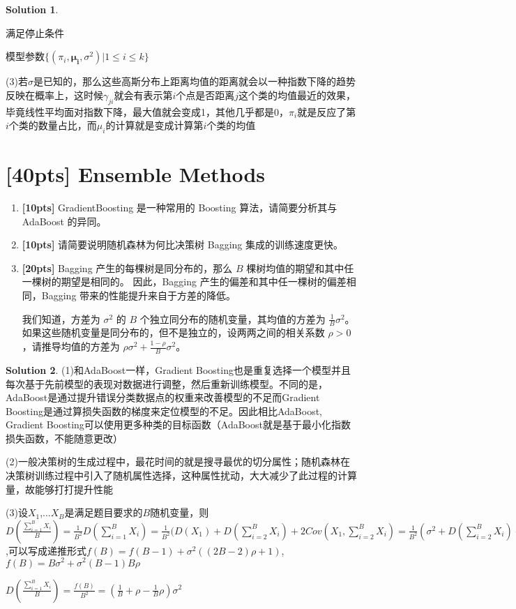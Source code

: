 \documentclass[a4paper,UTF8]{article}
\theoremstyle{definition}
\newtheorem*{solution}{Solution}
\begin{document}
\begin{solution}
\begin{algorithm}[H]
\begin{algorithmic}[1]
	\Until 满足停止条件

	\Ensure 模型参数$\{(\pi_i,\mathbf{\mu_i},\sigma^2)|1\leq i \leq k\}$

	\end{algorithmic}
	\end{algorithm}  


	(3)若$\sigma$是已知的，那么这些高斯分布上距离均值的距离就会以一种指数下降的趋势反映在概率上，这时候$\gamma_{ji}$就会有表示第$i$个点是否距离$j$这个类的均值最近的效果，毕竟线性平均面对指数下降，最大值就会变成1，其他几乎都是0，$\pi_i$就是反应了第$i$个类的数量占比，而$\mu_i$的计算就是变成计算第$i$个类的均值


\end{solution}

\section{[40pts] Ensemble Methods}
\begin{enumerate}[(1)]
	\item \textbf{[10pts]} GradientBoosting\cite{friedman2001greedy} 是一种常用的 Boosting 算法，请简要分析其与 AdaBoost 的异同。
	\item \textbf{[10pts]} 请简要说明随机森林为何比决策树 Bagging 集成的训练速度更快。 
	\item \textbf{[20pts]} Bagging 产生的每棵树是同分布的，那么 $B$ 棵树均值的期望和其中任一棵树的期望是相同的。
	因此，Bagging 产生的偏差和其中任一棵树的偏差相同，Bagging 带来的性能提升来自于方差的降低。
	
	我们知道，方差为 $\sigma^2$ 的 $B$ 个独立同分布的随机变量，其均值的方差为 $\frac{1}{B}\sigma^2$。如果这些随机变量是同分布的，但不是独立的，设两两之间的相关系数 $\rho>0$，请推导均值的方差为 $\rho \sigma^{2}+\frac{1-\rho}{B} \sigma^{2}$。
\end{enumerate}

\begin{solution}

   (1)和AdaBoost一样，Gradient Boosting也是重复选择一个模型并且每次基于先前模型的表现对数据进行调整，然后重新训练模型。不同的是，AdaBoost是通过提升错误分类数据点的权重来改善模型的不足而Gradient Boosting是通过算损失函数的梯度来定位模型的不足。因此相比AdaBoost, Gradient Boosting可以使用更多种类的目标函数（AdaBoost就是基于最小化指数损失函数，不能随意更改）

	(2)一般决策树的生成过程中，最花时间的就是搜寻最优的切分属性；随机森林在决策树训练过程中引入了随机属性选择，这种属性扰动，大大减少了此过程的计算量，故能够打打提升性能
	
	(3)设$X_1$,...$X_B$是满足题目要求的$B$随机变量，则$D(\frac{\sum_{i=1}^B X_i}{B})=\frac{1}{B^2}D(\sum_{i=1}^B X_i)=\frac{1}{B^2}(D(X_1)+D(\sum_{i=2}^B X_i)+2Cov(X_1,\sum_{i=2}^B X_i)=\frac{1}{B^2}(\sigma^2+D(\sum_{i=2}^B X_i)+2\sum_{i=2}^B Cov(X_1,X_i))=\frac{1}{B^2}(\sigma^2+D(\sum_{i=2}^B X_i)+2\rho \sigma^2)$,可以写成递推形式$f(B)=f(B-1)+\sigma^2((2B-2)\rho+1)$,$f(B)=B\sigma^2+\sigma^2(B-1)B\rho$

	$D(\frac{\sum_{i=1}^B X_i}{B})=\frac{f(B)}{B^2}=(\frac{1}{B}+\rho-\frac{1}{B}\rho)\sigma^2$
\end{solution}



\end{document}
